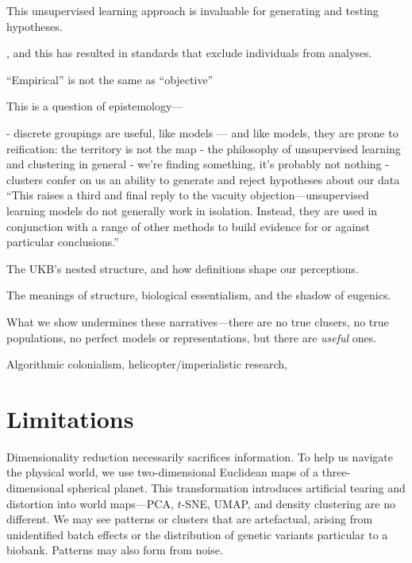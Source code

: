 This unsupervised learning approach is invaluable for generating and testing hypotheses\citep{watson_philosophy_2023}.


, and this has resulted in standards that exclude individuals from analyses\citep{ding_polygenic_2023}.

``Empirical'' is not the same as ``objective''

This is a question of epistemology---


- discrete groupings are useful, like models --- and like models, they are prone to reification: the territory is not the map
- the philosophy of unsupervised learning and clustering in general
- we're finding something, it's probably not nothing
- clusters confer on us an ability to generate and reject hypotheses about our data ``This raises a third and final reply to the vacuity objection—unsupervised learning models do not generally work in isolation. Instead, they are used in conjunction with a range of other methods to build evidence for or against particular conclusions.''


The UKB's nested structure, and how definitions shape our perceptions.




The meanings of structure, biological essentialism, and the shadow of eugenics.

What we show undermines these narratives---there are no true clusers, no true populations, no perfect models or representations, but there are \textit{useful} ones.

Algorithmic colonialism, helicopter/imperialistic research, 

\citep{gebru_race_2020}


\section{Limitations}

Dimensionality reduction necessarily sacrifices information. To help us navigate the physical world, we use two-dimensional Euclidean maps of a three-dimensional spherical planet. This transformation introduces artificial tearing and distortion into world maps---PCA, $t$-SNE, UMAP, and density clustering are no different. We may see patterns or clusters that are artefactual, arising from unidentified batch effects or the distribution of genetic variants particular to a biobank. Patterns may also form from noise. 

